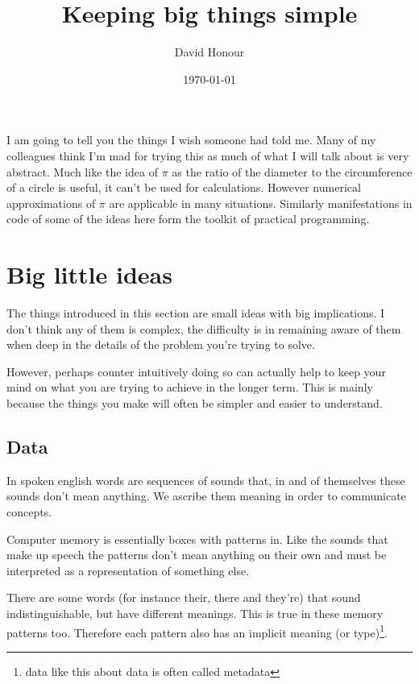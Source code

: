 \documentclass{article}
\title{Keeping big things simple}
\author{David Honour}
\date{\today}
\begin{document}
\maketitle

I am going to tell you the things I wish someone had told me.
Many of my colleagues think I'm mad for trying this as much of what I will talk
about is very abstract.
Much like the idea of $\pi$ as the ratio of the diameter to the circumference
of a circle is useful, it can't be used for calculations.
However numerical approximations of $\pi$ are applicable in many situations.
Similarly manifestations in code of some of the ideas here form the toolkit of
practical programming.

\section{Big little ideas}
The things introduced in this section are small ideas with big implications.
I don't think any of them is complex, the difficulty is in remaining aware of
them when deep in the details of the problem you're trying to solve.

However, perhaps counter intuitively doing so can actually help to keep your
mind on what you are trying to achieve in the longer term. This is mainly
because the things you make will often be simpler and easier to understand.
\subsection{Data}
In spoken english words are sequences of sounds that, in and of themselves
these sounds don't mean anything. We ascribe them meaning in order to
communicate concepts.

Computer memory is essentially boxes with patterns in.
Like the sounds that make up speech the patterns don't mean anything on their
own and must be interpreted as a representation of something else.

There are some words (for instance their, there and they're) that sound
indistinguishable, but have different meanings. This is true in these memory
patterns too. Therefore each pattern also has an implicit meaning (or
type)\footnote{data like this about data is often called metadata}.
\end{document}
